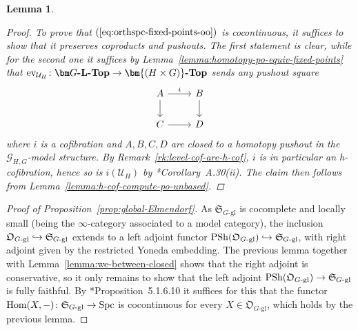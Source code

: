 \documentclass[reqno]{memo-l}
\theoremstyle{mythm}
\newtheorem{lemma}[thm]{Lemma}
\theoremstyle{definition}
\numberwithin{equation}{section}
\newcommand{\Uu}{{\mathcal{U}}}
\DeclareMathOperator{\ev}{ev}
\DeclareMathOperator{\Spc}{Spc}
\renewcommand{\hom}{\textup{hom}}
\DeclareMathOperator{\PSh}{PSh}
\newcommand{\cat}[1]{\textbf{\textup{#1}}}
\renewcommand{\hom}{{\textup{Hom}}}
\newcommand{\myS}{{{\mathfrak S\kern-.4pt}}}
\begin{document}
\begin{lemma}
\begin{proof}
        To prove that $(\ref{eq:orthspc-fixed-points-oo})$ is cocontinuous, it suffices to show that it preserves coproducts and pushouts. The first statement is clear, while for the second one it suffices by Lemma~\ref{lemma:homotopy-po-equiv-fixed-points} that $\ev_{\Uu_H}\colon\cat{$\bm G$-$\cat{L}$-Top}\to\cat{$\bm{(H\times G)}$-Top}$ sends any pushout square
        \[
            \begin{tikzcd}
                A\arrow[r,"i"]\arrow[d] & B\arrow[d]\\
                C\arrow[r] & D
            \end{tikzcd}
        \]
        where $i$ is a cofibration and $A,B,C,D$ are closed to a homotopy pushout in the $\mathcal G_{H,G}$-model structure. By Remark~\ref{rk:level-cof-are-h-cof}, $i$ is in particular an h-cofibration, hence so is $i(\Uu_H)$ by \cite{schwede2018global}*{Corollary~A.30(ii)}. The claim then follows from Lemma~\ref{lemma:h-cof-compute-po-unbased}.
    \end{proof}
\end{lemma}

\begin{proof}[Proof of Proposition~\ref{prop:global-Elmendorf}]
    As $\mathfrak S_\text{$G$-gl}$ is cocomplete and locally small (being the $\infty$-category associated to a model category), the inclusion $\mathfrak O_\textup{$G$-gl}\hookrightarrow\myS_\textup{$G$-gl}$ extends to a left adjoint functor $\PSh(\mathfrak O_\textup{$G$-gl})\hookrightarrow\myS_\textup{$G$-gl}$, with right adjoint given by the restricted Yoneda embedding. The previous lemma together with Lemma~\ref{lemma:we-between-closed} shows that the right adjoint is conservative, so it only remains to show that the left adjoint $\PSh(\mathfrak O_\text{$G$-gl})\to\myS_\text{$G$-gl}$ is fully faithful. By \cite{HTT}*{Proposition~5.1.6.10} it suffices for this that the functor $\hom(X,-)\colon\myS_\text{$G$-gl}\to\Spc$ is cocontinuous for every $X\in\mathfrak O_\text{$G$-gl}$, which holds by the previous lemma.
\end{proof}
\end{document}

